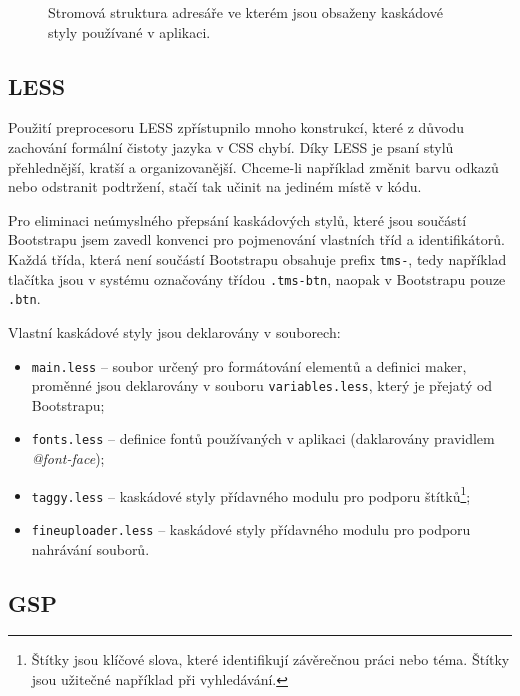 \begin{figure}
    \caption{Stromová struktura adresáře ve kterém jsou obsaženy kaskádové styly používané v aplikaci.}
    \label{fig:tree}
\end{figure}

\subsection{LESS}

Použití preprocesoru LESS zpřístupnilo mnoho konstrukcí, které z důvodu zachování formální čistoty jazyka v CSS chybí. Díky LESS je psaní stylů přehlednější, kratší a organizovanější. Chceme-li například změnit barvu odkazů nebo odstranit podtržení, stačí tak učinit na jediném místě v kódu.

Pro eliminaci neúmyslného přepsání kaskádových stylů, které jsou součástí Bootstrapu jsem zavedl konvenci pro pojmenování vlastních tříd a identifikátorů. Každá třída, která není součástí Bootstrapu obsahuje prefix \texttt{tms-}, tedy například tlačítka jsou v systému označovány třídou \texttt{.tms-btn}, naopak v Bootstrapu pouze \texttt{.btn}.

Vlastní kaskádové styly jsou deklarovány v souborech:

\begin{itemize}
    \item \texttt{main.less} -- soubor určený pro formátování elementů a definici maker, proměnné jsou deklarovány v souboru \texttt{variables.less}, který je přejatý od Bootstrapu;
    \item \texttt{fonts.less} -- definice fontů používaných v aplikaci (daklarovány pravidlem \textit{@font-face});
    \item \texttt{taggy.less} -- kaskádové styly přídavného modulu pro podporu štítků\footnote{Štítky jsou klíčové slova, které identifikují závěrečnou práci nebo téma. Štítky jsou užitečné například při vyhledávání.};
    \item \texttt{fineuploader.less} -- kaskádové styly přídavného modulu pro podporu nahrávání souborů.
\end{itemize}

\subsection{GSP}
\label{subsec:gsp}


